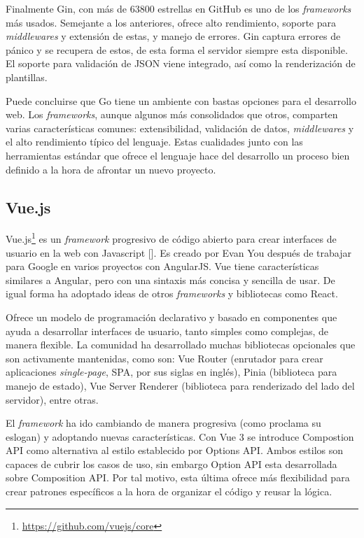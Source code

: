 Finalmente Gin, con más de 63800 estrellas en GitHub es uno de los \textit{frameworks} más usados. Semejante a los anteriores, ofrece alto rendimiento, soporte para \textit{middlewares} y extensión de estas, y manejo de errores. Gin captura errores  de pánico y se recupera de estos, de esta forma el servidor siempre esta disponible. El soporte para validación de JSON viene integrado, así como la renderización de plantillas.

Puede concluirse que Go tiene un ambiente con bastas opciones para el desarrollo web. Los \textit{frameworks}, aunque algunos más consolidados que otros, comparten varias características comunes: extensibilidad, validación de datos, \textit{middlewares} y el alto rendimiento típico del lenguaje. Estas cualidades junto con las herramientas estándar que ofrece el lenguaje hace del desarrollo un proceso bien definido a la hora de afrontar un nuevo proyecto.

\subsection{Vue.js}

Vue.js\footnote{\url{https://github.com/vuejs/core}} es un \textit{framework} progresivo de código abierto para crear interfaces de usuario en la web con Javascript [\cite{vue-docs}]. Es creado por Evan You después de trabajar para Google en varios proyectos con AngularJS. Vue tiene características similares a Angular, pero con una sintaxis más concisa y sencilla de usar. De igual forma ha adoptado ideas de otros \textit{frameworks} y bibliotecas como React.

Ofrece un modelo de programación declarativo y basado en componentes que ayuda a desarrollar interfaces de usuario, tanto simples como complejas, de manera flexible. La comunidad ha desarrollado muchas bibliotecas opcionales que son activamente mantenidas, como son: Vue Router (enrutador para crear aplicaciones \textit{single-page}, SPA, por sus siglas en inglés), Pinia (biblioteca para manejo de estado), Vue Server Renderer (biblioteca para renderizado del lado del servidor), entre otras.

El \textit{framework} ha ido cambiando de manera progresiva (como proclama su eslogan) y adoptando nuevas características. Con Vue 3 se introduce Compostion API como alternativa al estilo establecido por Options API. Ambos estilos son capaces de cubrir los casos de uso, sin embargo Option API esta desarrollada sobre Composition API. Por tal motivo, esta última ofrece más flexibilidad para crear patrones específicos a la hora de organizar el código y reusar la lógica.

